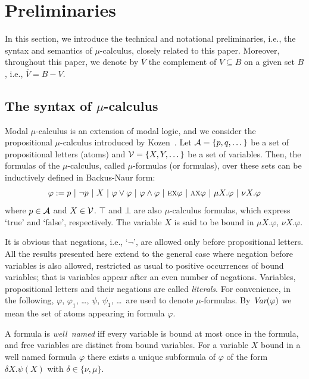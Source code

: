 \documentclass[runningheads]{llncs}
\begin{document}
\section{Preliminaries}  \label{preliminaries}
In this section, we introduce the technical and notational preliminaries, i.e., the  syntax and semantics of $\mu$-calculus, closely related to this paper.
Moreover, throughout this paper, we denote by $\overline V$ the complement of $V \subseteq B$ on a given set $B$, i.e., $\overline V = B -V$.

\subsection{The syntax of $\mu$-calculus}\label{mu-suntax}
Modal $\mu$-calculus is an extension of modal logic, and we consider the propositional $\mu$-calculus introduced by Kozen~\cite{DBLP:journals/cacm/Kozen83}.
Let ${\cal A}=\{p,q,\dots\}$ be a set of propositional letters (atoms) and ${\cal V}=\{X, Y, \dots\}$ be a set of variables.
Then, the formulas of the $\mu$-calculus, called $\mu$-formulas (or formulas), over these sets can be inductively defined in Backus-Naur form:
\[
\varphi := p\ |\ \neg p\ |\ X\ |\ \varphi \vee \varphi\ |\ \varphi \wedge \varphi \ |\ \EXIST\NEXT \varphi\ |\ \ALL\NEXT \varphi\ |\ \mu X. \varphi\ |\ \nu X. \varphi
\]
where $p\in {\cal A}$ and $X\in {\cal V}$. $\top$ and $\bot$ are also $\mu$-calculus formulas, which express `true' and `false', respectively.
The variable $X$ is said to be bound in $\mu X. \varphi$, $\nu X. \varphi$.

It is obvious that negations, i.e., `$\neg$', are allowed only before propositional letters.
All the results
presented here extend to the general case where negation before variables is also
allowed, restricted as usual to positive occurrences of bound variables; that is variables appear after an even number of negations.
Variables, propositional letters and their negations are called \emph{literals}.
For convenience, in the following, $\varphi$, $\varphi_1$, \dots, $\psi$, $\psi_1$, \dots\ are used to denote $\mu$-formulas.
By $\textit{Var}(\varphi)$ we mean the set of atoms appearing in formula $\varphi$.



A formula is \emph{well\ named} iff every variable is bound at most once in the formula, and free variables are distinct from bound
variables. For a variable $X$ bound in a well named formula $\varphi$ there exists a unique subformula of $\varphi$ of the form $\delta X. \psi(X)$ with $\delta \in \{\nu, \mu\}$.
\end{document}
